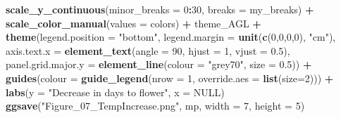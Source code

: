 \documentclass[
]{article}
\newenvironment{Shaded}{\begin{snugshade}}{\end{snugshade}}
\newcommand{\DataTypeTok}[1]{\textcolor[rgb]{0.13,0.29,0.53}{#1}}
\newcommand{\DecValTok}[1]{\textcolor[rgb]{0.00,0.00,0.81}{#1}}
\newcommand{\FloatTok}[1]{\textcolor[rgb]{0.00,0.00,0.81}{#1}}
\newcommand{\KeywordTok}[1]{\textcolor[rgb]{0.13,0.29,0.53}{\textbf{#1}}}
\newcommand{\NormalTok}[1]{#1}
\newcommand{\OperatorTok}[1]{\textcolor[rgb]{0.81,0.36,0.00}{\textbf{#1}}}
\newcommand{\OtherTok}[1]{\textcolor[rgb]{0.56,0.35,0.01}{#1}}
\newcommand{\StringTok}[1]{\textcolor[rgb]{0.31,0.60,0.02}{#1}}
\begin{document}
\begin{Shaded}
\begin{Highlighting}[]
\StringTok{  }\KeywordTok{scale_y_continuous}\NormalTok{(}\DataTypeTok{minor_breaks =} \DecValTok{0}\OperatorTok{:}\DecValTok{30}\NormalTok{, }\DataTypeTok{breaks =}\NormalTok{ my_breaks) }\OperatorTok{+}
\StringTok{  }\KeywordTok{scale_color_manual}\NormalTok{(}\DataTypeTok{values =}\NormalTok{ colors) }\OperatorTok{+}
\StringTok{  }\NormalTok{theme_AGL }\OperatorTok{+}\StringTok{ }
\StringTok{  }\KeywordTok{theme}\NormalTok{(}\DataTypeTok{legend.position =} \StringTok{"bottom"}\NormalTok{, }\DataTypeTok{legend.margin =} \KeywordTok{unit}\NormalTok{(}\KeywordTok{c}\NormalTok{(}\DecValTok{0}\NormalTok{,}\DecValTok{0}\NormalTok{,}\DecValTok{0}\NormalTok{,}\DecValTok{0}\NormalTok{), }\StringTok{"cm"}\NormalTok{),}
        \DataTypeTok{axis.text.x =} \KeywordTok{element_text}\NormalTok{(}\DataTypeTok{angle =} \DecValTok{90}\NormalTok{, }\DataTypeTok{hjust =} \DecValTok{1}\NormalTok{, }\DataTypeTok{vjust =} \FloatTok{0.5}\NormalTok{),}
        \DataTypeTok{panel.grid.major.y =} \KeywordTok{element_line}\NormalTok{(}\DataTypeTok{colour =} \StringTok{"grey70"}\NormalTok{, }\DataTypeTok{size =} \FloatTok{0.5}\NormalTok{)) }\OperatorTok{+}
\StringTok{  }\KeywordTok{guides}\NormalTok{(}\DataTypeTok{colour =} \KeywordTok{guide_legend}\NormalTok{(}\DataTypeTok{nrow =} \DecValTok{1}\NormalTok{, }\DataTypeTok{override.aes =} \KeywordTok{list}\NormalTok{(}\DataTypeTok{size=}\DecValTok{2}\NormalTok{))) }\OperatorTok{+}
\StringTok{  }\KeywordTok{labs}\NormalTok{(}\DataTypeTok{y =} \StringTok{"Decrease in days to flower"}\NormalTok{, }\DataTypeTok{x =} \OtherTok{NULL}\NormalTok{)}
\KeywordTok{ggsave}\NormalTok{(}\StringTok{"Figure_07_TempIncrease.png"}\NormalTok{, mp, }\DataTypeTok{width =} \DecValTok{7}\NormalTok{, }\DataTypeTok{height =} \DecValTok{5}\NormalTok{)}
\end{Highlighting}
\end{Shaded}
\end{document}
